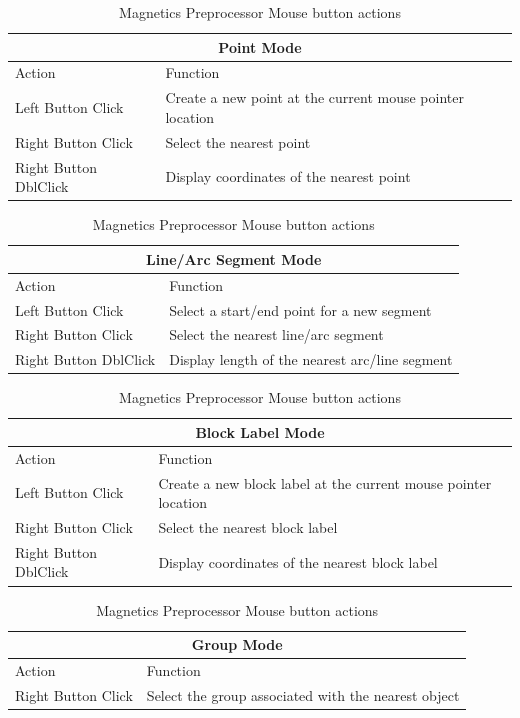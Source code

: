 \documentclass[12pt]{report}
\begin{document}
\begin{table}[ht]
\centering
\begin{tabular}{|l|l|} \hline \hline
\multicolumn{2}{|c|}{Point Mode} \\ \hline \hline
 Action    & Function \\ \hline \hline
 Left Button Click     & Create a new point at the current mouse pointer location \\ \hline
 Right Button Click    & Select the nearest point \\ \hline
 Right Button DblClick & Display coordinates of the nearest point \\ \hline \hline
\end{tabular}

\vspace*{12pt}
\begin{tabular}{|l|l|} \hline \hline
\multicolumn{2}{|c|}{Line/Arc Segment Mode} \\ \hline \hline
 Action    & Function \\ \hline \hline
 Left Button Click     & Select a start/end point for a new segment \\ \hline
 Right Button Click    & Select the nearest line/arc segment \\ \hline
 Right Button DblClick & Display length of the nearest arc/line segment \\ \hline \hline
\end{tabular}

\vspace*{12pt}
\begin{tabular}{|l|l|} \hline \hline
\multicolumn{2}{|c|}{Block Label Mode} \\ \hline \hline
 Action    & Function \\ \hline \hline
 Left Button Click     & Create a new block label at the current mouse pointer location \\ \hline
 Right Button Click    & Select the nearest block label \\ \hline
 Right Button DblClick & Display coordinates of the nearest block label \\ \hline \hline
\end{tabular}

\vspace*{12pt}
\begin{tabular}{|l|l|} \hline \hline
\multicolumn{2}{|c|}{Group Mode} \\ \hline \hline
 Action    & Function \\ \hline \hline
 Right Button Click    & Select the group associated with the nearest object \\ \hline \hline
\end{tabular}
\caption{Magnetics Preprocessor Mouse button actions}
\label{mouseclicks}
\end{table}
\end{document}
